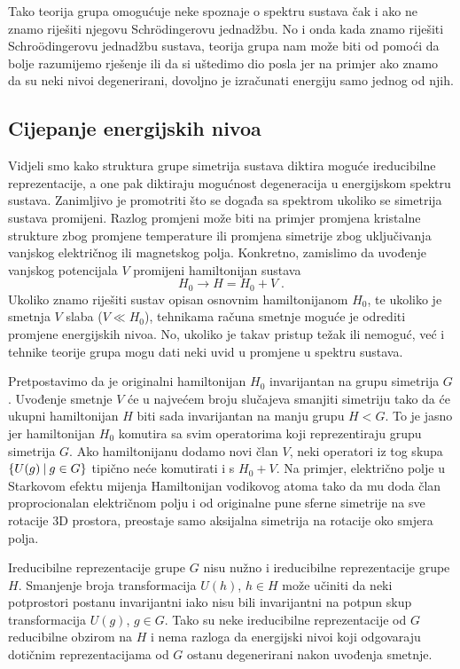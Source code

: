 Tako teorija grupa omogućuje neke spoznaje o spektru sustava
čak i ako ne znamo riješiti njegovu Schr\"{o}dingerovu jednadžbu.
No i onda kada znamo riješiti Schro\"{o}dingerovu
jednadžbu sustava, teorija grupa nam može biti od pomoći
da bolje razumijemo rješenje ili da si uštedimo dio posla jer
na primjer ako znamo da su neki nivoi degenerirani, dovoljno je izračunati
energiju samo jednog od njih.

\subsection*{Cijepanje energijskih nivoa}

Vidjeli smo kako struktura grupe simetrija sustava diktira moguće
ireducibilne reprezentacije, a one pak diktiraju mogućnost 
degeneracija u energijskom spektru sustava. Zanimljivo je promotriti
što se događa sa spektrom ukoliko se simetrija sustava promijeni.
Razlog promjeni može biti na primjer promjena kristalne strukture
zbog promjene temperature ili promjena simetrije zbog uključivanja
vanjskog električnog ili magnetskog polja.
Konkretno, zamislimo da uvođenje vanjskog potencijala $V$  promijeni hamiltonijan
sustava
\begin{displaymath}
    H_0 \to H = H_0 + V \;.
\end{displaymath}
Ukoliko znamo riješiti sustav opisan osnovnim hamiltonijanom $H_0$, te
ukoliko je smetnja $V$ slaba ($V\ll H_0$), tehnikama računa smetnje
moguće je  odrediti promjene energijskih nivoa. No, ukoliko je takav
pristup težak ili nemoguć, već i tehnike teorije grupa mogu dati neki uvid
u promjene u spektru sustava. 

Pretpostavimo da je originalni hamiltonijan $H_0$ invarijantan na
grupu simetrija $G$. Uvođenje smetnje $V$ će u najvećem broju
slučajeva smanjiti simetriju tako da će ukupni hamiltonijan $H$ 
biti sada invarijantan na manju grupu $H<G$. To je jasno jer 
hamiltonijan $H_0$ komutira sa svim operatorima koji reprezentiraju
grupu simetrija $G$. Ako hamiltonijanu dodamo novi član $V$, neki operatori iz
tog skupa $\{U(g) \: | \: g\in G\}$ tipično neće komutirati i s $H_0 + V$.
Na primjer, električno polje u Starkovom efektu mijenja Hamiltonijan
vodikovog atoma tako da mu doda član proprocionalan električnom polju
i od originalne pune sferne simetrije na sve rotacije 3D prostora,
preostaje samo aksijalna simetrija na rotacije oko smjera polja.

Ireducibilne reprezentacije grupe $G$ nisu nužno i ireducibilne
reprezentacije grupe $H$. Smanjenje broja transformacija
$U(h)$, $h\in H$ može učiniti da neki potprostori postanu invarijantni
iako nisu bili invarijantni na potpun skup transformacija $U(g)$, $g\in G$.
Tako su neke ireducibilne reprezentacije od $G$ reducibilne obzirom na $H$
i nema razloga da energijski nivoi koji odgovaraju dotičnim reprezentacijama
od $G$ ostanu degenerirani nakon uvođenja smetnje.

